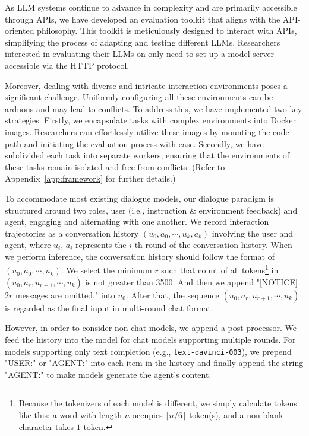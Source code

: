 As LLM systems continue to advance in complexity and are primarily accessible through APIs, we have developed an evaluation toolkit that aligns with the API-oriented philosophy. This toolkit is meticulously designed to interact with APIs, simplifying the process of adapting and testing different LLMs. Researchers interested in evaluating their LLMs on \model only need to set up a model server accessible via the HTTP protocol.

Moreover, dealing with diverse and intricate interaction environments poses a significant challenge. Uniformly configuring all these environments can be arduous and may lead to conflicts. To address this, we have implemented two key strategies. Firstly, we encapsulate tasks with complex environments into Docker images. Researchers can effortlessly utilize these images by mounting the code path and initiating the evaluation process with ease. Secondly, we have subdivided each task into separate workers, ensuring that the environments of these tasks remain isolated and free from conflicts. (Refer to Appendix~\ref{app:framework} for further details.)

To accommodate most existing dialogue models, our dialogue paradigm is structured around two roles, user (i.e., instruction \& environment feedback) and agent, engaging and alternating with one another. 
We record interaction trajectories as a conversation history $(u_0, a_0, \cdots, u_k, a_k)$ involving the user and agent, where $u_i$, $a_i$ represents the $i$-th round of the conversation history. 
When we perform inference, the conversation history should follow the format of $(u_0, a_0, \cdots, u_k)$.
We select the minimum $r$ such that count of all tokens\footnote{Because the tokenizers of each model is different, we simply calculate tokens like this: a word with length $n$ occupies $\lceil n/6\rceil$ token(s), and a non-blank character takes $1$ token.} in $(u_0, a_r, u_{r+1}, \cdots, u_k)$ is not greater than 3500. And then we append "[NOTICE] $2r$ messages are omitted." into $u_0$. 
After that, the sequence $(u_0, a_r, u_{r+1}, \cdots, u_k)$ is regarded as the final input in multi-round chat format.

However, in order to consider non-chat models, we append a post-processor. 
We feed the history into the model for chat models supporting multiple rounds. 
For models supporting only text completion (e.g., \texttt{text-davinci-003}), we prepend "USER:" or "AGENT:" into each item in the history and finally append the string "AGENT:" to make models generate the agent's content.

